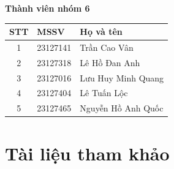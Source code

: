 \documentclass[12pt,a4paper]{article}
\begin{document}
\begin{titlepage}
  \vspace{0.5cm}

  {\Large\bfseries Thành viên nhóm 6}\par
  \vspace{0.2cm}

  \small
  \begin{tabular}{@{}cll@{}}
    \toprule
    \textbf{STT} & \textbf{MSSV} & \textbf{Họ và tên} \\
    \midrule
    1 & 23127141 & Trần Cao Vân \\
    2 & 23127318 & Lê Hồ Đan Anh \\
    3 & 23127016 & Lưu Huy Minh Quang \\
    4 & 23127404 & Lê Tuấn Lộc \\
    5 & 23127465 & Nguyễn Hồ Anh Quốc \\
    \bottomrule
  \end{tabular}\par
  \normalsize

\end{titlepage}

\newpage
{}
\tableofcontents
\newpage






\section{Tài liệu tham khảo}

\nocite{*}

\end{document}
